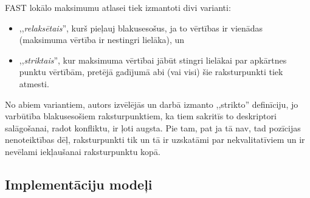 FAST lokālo maksimumu atlasei tiek izmantoti divi varianti:
\begin{itemize}
	\item ,,\emph{relaksētais}'', kurš pieļauj blakusesošus, ja to
		vērtības ir vienādas (maksimuma vērtība ir nestingri lielāka), un
	\item ,,\emph{striktais}'', kur maksimuma vērtībai jābūt stingri
		lielākai par apkārtnes punktu vērtībām, pretējā gadījumā abi (vai
		visi) šie raksturpunkti tiek atmesti.
\end{itemize}
No abiem variantiem, autors izvēlējās un darbā izmanto ,,strikto'' definīciju,
jo varbūtība blakusesošiem raksturpunktiem, ka tiem sakritīs to
deskriptori salāgošanai, radot konfliktu, ir ļoti augsta.
Pie tam, pat ja tā nav, tad pozīcijas nenoteiktības dēļ, raksturpunkti tik
un tā ir uzskatāmi par nekvalitatīviem un ir nevēlami iekļaušanai
raksturpunktu kopā.

\subsection{Implementāciju modeļi} \label{sec:fast-impl}




